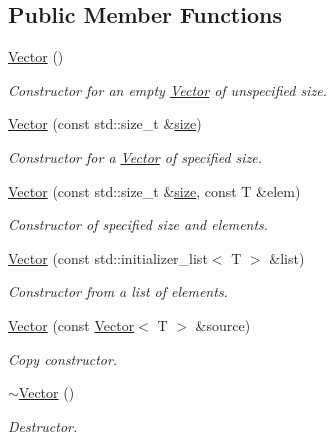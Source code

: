 \subsection*{Public Member Functions}
\begin{DoxyCompactItemize}
\item 
\hyperlink{classLuna_1_1Vector_a8dd08d46db516e9b06501f83fc01c22c}{Vector} ()
\begin{DoxyCompactList}\small\item\em Constructor for an empty \hyperlink{classLuna_1_1Vector}{Vector} of unspecified size. \end{DoxyCompactList}\item 
\hyperlink{classLuna_1_1Vector_a6f7d89a8dfbf7fd0543c843b897a6b05}{Vector} (const std\+::size\+\_\+t \&\hyperlink{classLuna_1_1Vector_ac9b6ed7a0df401728f27c193fbc8f4d8}{size})
\begin{DoxyCompactList}\small\item\em Constructor for a \hyperlink{classLuna_1_1Vector}{Vector} of specified size. \end{DoxyCompactList}\item 
\hyperlink{classLuna_1_1Vector_a0041d60c76553a0d51a2c5c7b9df557f}{Vector} (const std\+::size\+\_\+t \&\hyperlink{classLuna_1_1Vector_ac9b6ed7a0df401728f27c193fbc8f4d8}{size}, const T \&elem)
\begin{DoxyCompactList}\small\item\em Constructor of specified size and elements. \end{DoxyCompactList}\item 
\hyperlink{classLuna_1_1Vector_acb8301bdca059a3880eb3478f52fca2d}{Vector} (const std\+::initializer\+\_\+list$<$ T $>$ \&list)
\begin{DoxyCompactList}\small\item\em Constructor from a list of elements. \end{DoxyCompactList}\item 
\hyperlink{classLuna_1_1Vector_aa6a0a3ba8b22ee42e3ffd5087950644d}{Vector} (const \hyperlink{classLuna_1_1Vector}{Vector}$<$ T $>$ \&source)
\begin{DoxyCompactList}\small\item\em Copy constructor. \end{DoxyCompactList}\item 
\hyperlink{classLuna_1_1Vector_ab2453cc67935af9a0dd0b86292bd47d8}{$\sim$\+Vector} ()
\begin{DoxyCompactList}\small\item\em Destructor. \end{DoxyCompactList}\item 

\end{DoxyCompactItemize}
